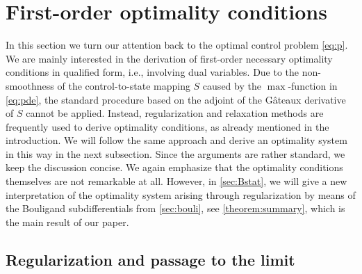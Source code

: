 \documentclass[reqno]{shinyart}
\begin{document}
\section{First-order optimality conditions}\label{sec:fon}

In this section we turn our attention back to the optimal control problem \eqref{eq:p}. 
We are mainly interested in the derivation of first-order necessary optimality conditions in 
qualified form, i.e., involving dual variables. Due to the non-smoothness of the 
control-to-state mapping $S$ caused by the $\max$-function in \eqref{eq:pde}, 
the standard procedure based on the adjoint of the G\^ateaux derivative of $S$ cannot be applied. 
Instead, regularization and relaxation methods are frequently used to derive optimality conditions, 
as already mentioned in the introduction. 
We will follow the same approach and derive an optimality system in this way 
in the next subsection. Since the arguments are rather standard, we keep the discussion concise. 
We again emphasize that the optimality conditions themselves are not remarkable at all. 
However, in \cref{sec:Bstat}, we will give a new interpretation of the 
optimality system arising through regularization by means of the Bouligand subdifferentials 
from \cref{sec:bouli}, see \cref{theorem:summary}, which is the main 
result of our paper.

\subsection{Regularization and passage to the limit}\label{sec:limit}
\end{document}
